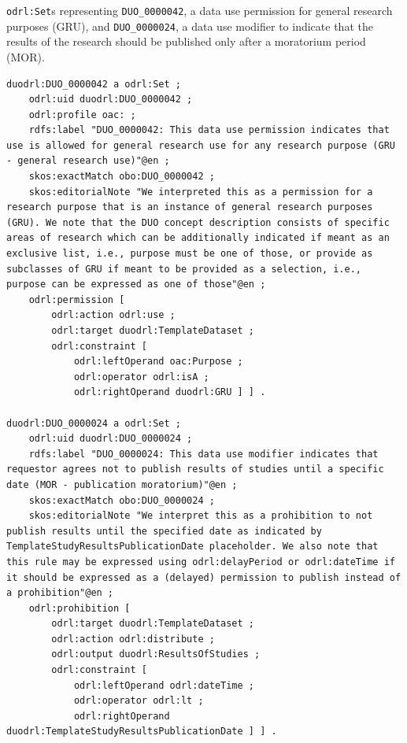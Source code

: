 \begin{listing}[htp]
\caption[\texttt{odrl:Set}s representing DUO's GRU and MOR concepts.]{\texttt{odrl:Set}s representing \texttt{DUO\_0000042}, a data use permission for general research purposes (GRU), and \texttt{DUO\_0000024}, a data use modifier to indicate that the results of the research should be published only after a moratorium period (MOR).}
\label{list:duodrl_set}
\begin{verbatim}
duodrl:DUO_0000042 a odrl:Set ;
    odrl:uid duodrl:DUO_0000042 ;
    odrl:profile oac: ;
    rdfs:label "DUO_0000042: This data use permission indicates that use is allowed for general research use for any research purpose (GRU - general research use)"@en ;
    skos:exactMatch obo:DUO_0000042 ;
    skos:editorialNote "We interpreted this as a permission for a research purpose that is an instance of general research purposes (GRU). We note that the DUO concept description consists of specific areas of research which can be additionally indicated if meant as an exclusive list, i.e., purpose must be one of those, or provide as subclasses of GRU if meant to be provided as a selection, i.e., purpose can be expressed as one of those"@en ;
    odrl:permission [
        odrl:action odrl:use ;
        odrl:target duodrl:TemplateDataset ;
        odrl:constraint [
            odrl:leftOperand oac:Purpose ;
            odrl:operator odrl:isA ;
            odrl:rightOperand duodrl:GRU ] ] .
    
duodrl:DUO_0000024 a odrl:Set ;
    odrl:uid duodrl:DUO_0000024 ;
    rdfs:label "DUO_0000024: This data use modifier indicates that requestor agrees not to publish results of studies until a specific date (MOR - publication moratorium)"@en ;
    skos:exactMatch obo:DUO_0000024 ;
    skos:editorialNote "We interpret this as a prohibition to not publish results until the specified date as indicated by TemplateStudyResultsPublicationDate placeholder. We also note that this rule may be expressed using odrl:delayPeriod or odrl:dateTime if it should be expressed as a (delayed) permission to publish instead of a prohibition"@en ;
    odrl:prohibition [
        odrl:target duodrl:TemplateDataset ;
        odrl:action odrl:distribute ;
        odrl:output duodrl:ResultsOfStudies ;
        odrl:constraint [
            odrl:leftOperand odrl:dateTime ;
            odrl:operator odrl:lt ;
            odrl:rightOperand duodrl:TemplateStudyResultsPublicationDate ] ] .
\end{verbatim}
\end{listing}

